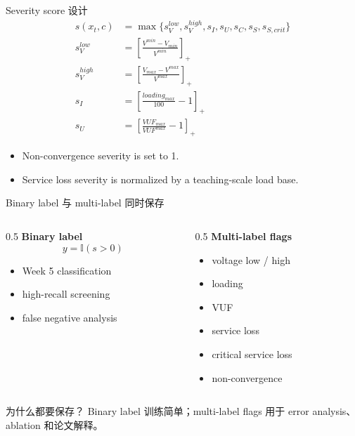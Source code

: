\documentclass[aspectratio=169,11pt]{beamer}
\newcommand{\relu}[1]{\left[#1\right]_{+}}
\begin{document}
\begin{frame}{Severity score 设计}
\small
\begin{align*}
s(x_t,c)&=\max\{s_V^{low},s_V^{high},s_I,s_U,s_C,s_S,s_{S,crit}\}\\
s_V^{low}&=\relu{\frac{V^{min}-V_{min}}{V^{min}}}\\
s_V^{high}&=\relu{\frac{V_{max}-V^{max}}{V^{max}}}\\
s_I&=\relu{\frac{loading_{max}}{100}-1}\\
s_U&=\relu{\frac{VUF_{max}}{VUF^{max}}-1}
\end{align*}
\begin{itemize}
  \item Non-convergence severity is set to 1.
  \item Service loss severity is normalized by a teaching-scale load base.
\end{itemize}
\end{frame}

\begin{frame}{Binary label 与 multi-label 同时保存}
\begin{columns}
\begin{column}{0.5\textwidth}
\textbf{Binary label}\
\[
y=\mathbb{I}(s>0)
\]
\begin{itemize}
  \item Week 5 classification
  \item high-recall screening
  \item false negative analysis
\end{itemize}
\end{column}
\begin{column}{0.5\textwidth}
\textbf{Multi-label flags}\
\begin{itemize}
  \item voltage low / high
  \item loading
  \item VUF
  \item service loss
  \item critical service loss
  \item non-convergence
\end{itemize}
\end{column}
\end{columns}
\begin{block}{为什么都要保存？}
Binary label 训练简单；multi-label flags 用于 error analysis、ablation 和论文解释。
\end{block}
\end{frame}
\end{document}
